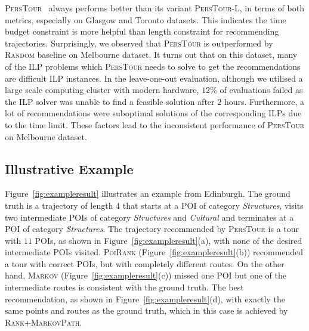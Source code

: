 \textsc{PersTour}~\cite{ijcai15} always performs better than its variant \textsc{PersTour-L},
in terms of both metrics, especially on Glasgow and Toronto datasets.
This indicates the time budget constraint is more helpful than length constraint for recommending trajectories.
Surprisingly, we observed that \textsc{PersTour} is outperformed by \textsc{Random} baseline on Melbourne dataset. %
It turns out that on this dataset, many of the ILP problems
which \textsc{PersTour} needs to solve to get the recommendations are difficult ILP instances.
In the leave-one-out evaluation, although we utilised a large scale computing cluster with modern hardware,
$12\%$ of evaluations failed as the ILP solver was unable to find a feasible solution after $2$ hours.
Furthermore, a lot of recommendations were suboptimal solutions of the corresponding ILPs due to
the time limit. These factors lead to the inconsistent performance of \textsc{PersTour} on Melbourne dataset.



\subsection{Illustrative Example}
\label{sec:example}



Figure~\ref{fig:exampleresult} illustrates an example %
from Edinburgh.
The ground truth is a trajectory of length $4$ that starts at a POI of category \textit{Structures},
visits two intermediate POIs of category \textit{Structures} and \textit{Cultural} and
terminates at a POI of category \textit{Structures}.
The trajectory recommended by \textsc{PersTour} is a tour with $11$ POIs, as shown in Figure~\ref{fig:exampleresult}(a),
with none of the desired intermediate POIs visited.
\textsc{PoiRank} (Figure~\ref{fig:exampleresult}(b)) recommended a tour with correct POIs,
but with completely different routes.
On the other hand, \textsc{Markov} (Figure~\ref{fig:exampleresult}(c)) missed one POI
but one of the intermediate routes is consistent with the ground truth.
The best recommendation, as shown in Figure~\ref{fig:exampleresult}(d),
with exactly the same points and routes as the ground truth,
which in this case is achieved by \textsc{Rank+MarkovPath}.
